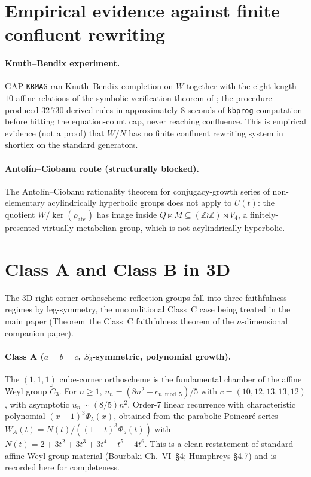\documentclass[11pt,a4paper]{article}
\theoremstyle{remark}
\theoremstyle{plain}
\begin{document}
\section{Empirical evidence against finite confluent rewriting}
\label{sec:rewriting}

\paragraph{Knuth--Bendix experiment.}
GAP \texttt{KBMAG} ran Knuth--Bendix completion on $W$ together with
the eight length-$10$ affine relations of the symbolic-verification theorem of \cite{Bonfioli2};
the procedure produced $32\,730$ derived rules in approximately $8$
seconds of \texttt{kbprog} computation before hitting the equation-count
cap, never reaching confluence.  This is empirical evidence (not a
proof) that $W/N$ has no finite confluent rewriting system in shortlex
on the standard generators.

\paragraph{Antol\'in--Ciobanu route (structurally blocked).}
The Antol\'in--Ciobanu rationality theorem for conjugacy-growth series
of non-elementary acylindrically hyperbolic groups does not apply to
$U(t)$: the quotient $W / \ker(\rho_{\mathrm{abs}})$ has image inside
$Q \ltimes M \subseteq (\mathbb{Z} \wr \mathbb{Z}) \rtimes V_4$, a
finitely-presented virtually metabelian group, which is not
acylindrically hyperbolic.

\section{Class A and Class B in 3D}
\label{sec:classes-AB}

The 3D right-corner orthoscheme reflection groups fall into three
faithfulness regimes by leg-symmetry, the unconditional Class~C case
being treated in the main paper (Theorem~the Class~C faithfulness theorem of the $n$-dimensional companion paper).

\paragraph{Class A ($a = b = c$, $S_3$-symmetric, polynomial growth).}
The $(1, 1, 1)$ cube-corner orthoscheme is the fundamental chamber of
the affine Weyl group $\widetilde{C}_3$.  For $n \ge 1$,
$u_n = (8 n^2 + c_{n \bmod 5})/5$ with $c = (10, 12, 13, 13, 12)$, with
asymptotic $u_n \sim (8/5) n^2$.  Order-$7$ linear recurrence with
characteristic polynomial $(x-1)^3 \Phi_5(x)$, obtained from the
parabolic Poincar\'e series $W_A(t) = N(t) / ((1-t)^3 \Phi_5(t))$ with
$N(t) = 2 + 3t^2 + 3t^3 + 3t^4 + t^5 + 4t^6$.  This is a clean
restatement of standard affine-Weyl-group material (Bourbaki Ch.~VI~§4;
Humphreys \S4.7) and is recorded here for completeness.
\end{document}
